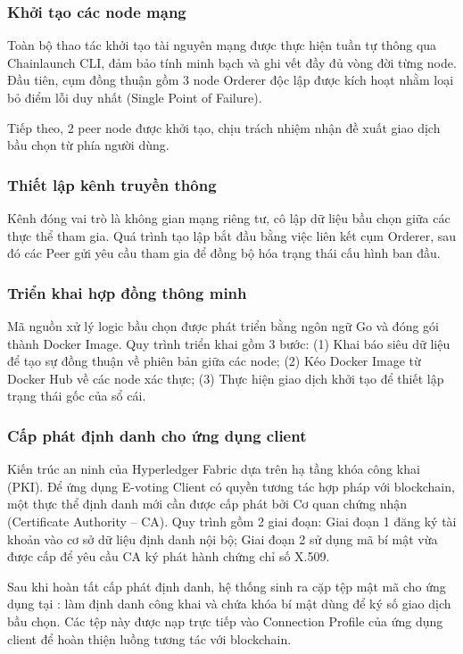 \subsubsection{Khởi tạo các node mạng}

Toàn bộ thao tác khởi tạo tài nguyên mạng được thực hiện tuần tự thông qua Chainlaunch CLI, đảm bảo tính minh bạch và ghi vết đầy đủ vòng đời từng node. Đầu tiên, cụm đồng thuận gồm 3 node Orderer độc lập được kích hoạt nhằm loại bỏ điểm lỗi duy nhất (Single Point of Failure).

Tiếp theo, 2 peer node được khởi tạo, chịu trách nhiệm nhận đề xuất giao dịch bầu chọn từ phía người dùng.

\subsubsection{Thiết lập kênh truyền thông}

Kênh  đóng vai trò là không gian mạng riêng tư, cô lập dữ liệu bầu chọn giữa các thực thể tham gia. Quá trình tạo lập bắt đầu bằng việc liên kết cụm Orderer, sau đó các Peer gửi yêu cầu tham gia để đồng bộ hóa trạng thái cấu hình ban đầu.

\subsubsection{Triển khai hợp đồng thông minh}

Mã nguồn xử lý logic bầu chọn được phát triển bằng ngôn ngữ Go và đóng gói thành Docker Image. Quy trình triển khai gồm 3 bước: (1) Khai báo siêu dữ liệu để tạo sự đồng thuận về phiên bản giữa các node; (2) Kéo Docker Image từ Docker Hub về các node xác thực; (3) Thực hiện giao dịch khởi tạo để thiết lập trạng thái gốc của sổ cái.

\subsubsection{Cấp phát định danh cho ứng dụng client}

Kiến trúc an ninh của Hyperledger Fabric dựa trên hạ tầng khóa công khai (PKI). Để ứng dụng E-voting Client có quyền tương tác hợp pháp với blockchain, một thực thể định danh mới cần được cấp phát bởi Cơ quan chứng nhận (Certificate Authority -- CA). Quy trình gồm 2 giai đoạn: Giai đoạn 1 đăng ký tài khoản  vào cơ sở dữ liệu định danh nội bộ; Giai đoạn 2 sử dụng mã bí mật vừa được cấp để yêu cầu CA ký phát hành chứng chỉ số X.509.

Sau khi hoàn tất cấp phát định danh, hệ thống sinh ra cặp tệp mật mã cho ứng dụng tại :  làm định danh công khai và  chứa khóa bí mật dùng để ký số giao dịch bầu chọn. Các tệp này được nạp trực tiếp vào Connection Profile của ứng dụng client để hoàn thiện luồng tương tác với blockchain.
